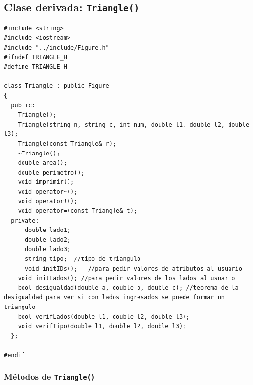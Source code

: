 \subsection{Clase derivada: \texttt{Triangle()}}

\begin{verbatim}
#include <string>
#include <iostream>
#include "../include/Figure.h"
#ifndef TRIANGLE_H
#define TRIANGLE_H

class Triangle : public Figure
{
  public:
    Triangle();
    Triangle(string n, string c, int num, double l1, double l2, double l3);
    Triangle(const Triangle& r);
    ~Triangle();
    double area();
    double perimetro();
    void imprimir();
    void operator~();
    void operator!();
    void operator=(const Triangle& t);
  private:
	  double lado1;
	  double lado2;
	  double lado3;
	  string tipo;	//tipo de triangulo
	  void initIDs();	//para pedir valores de atributos al usuario
  	void initLados(); //para pedir valores de los lados al usuario
  	bool desigualdad(double a, double b, double c); //teorema de la desigualdad para ver si con lados ingresados se puede formar un triangulo
  	bool verifLados(double l1, double l2, double l3);
  	void verifTipo(double l1, double l2, double l3);
  };

#endif

\end{verbatim}

\subsubsection{Métodos de \texttt{Triangle()}}

